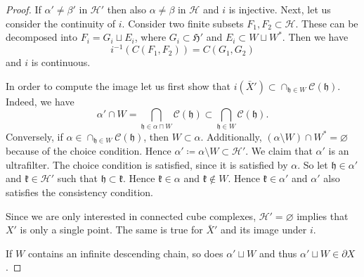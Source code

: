 \begin{proof}
  If \(\alpha' \neq \beta'\) in \(\mathcal{H}'\) then also \(\alpha \neq \beta\) in \(\mathcal{H}\) and \(i\) is injective. Next, let us consider the continuity of \(i\). Consider two finite subsets \(F_1, F_2 \subset \mathcal{H}\). These can be decomposed into \(F_i = G_i \sqcup E_i\), where \(G_i \subset \mathfrak{H}'\) and \(E_i \subset W \sqcup W^\ast\). Then we have
  \[
    i^{-1}(C(F_1, F_2)) = C(G_1, G_2)
  \]
  and \(i\) is continuous.

  In order to compute the image let us first show that \(i(\bar X') \subset \cap_{\mathfrak{h} \in W} \mathcal{C}(\mathfrak{h})\). Indeed, we have
  \[
    \alpha' \cap W = \bigcap_{\mathfrak{h} \in \alpha \sqcap W}\mathcal{C}(\mathfrak{h}) \subset \bigcap_{\mathfrak{h} \in W} \mathcal{C}(\mathfrak{h}).
  \]
  Conversely, if \(\alpha \in \cap_{\mathfrak{h} \in W}\mathcal{C}(\mathfrak{h})\), then \(W \subset \alpha\). Additionally, \((\alpha \setminus W) \cap W^\ast = \varnothing\) because of the choice condition. Hence \(\alpha' \coloneqq \alpha \setminus W \subset \mathcal{H}'\). We claim that \(\alpha'\) is an ultrafilter. The choice condition is satisfied, since it is satisfied by \(\alpha\). So let \(\mathfrak{h} \in \alpha'\) and \(\mathfrak{k} \in \mathcal{H}'\) such that \(\mathfrak{h} \subset \mathfrak{k}\). Hence \(\mathfrak{k} \in \alpha\) and \(\mathfrak{k} \notin W\). Hence \(\mathfrak{k} \in \alpha'\) and \(\alpha'\) also satisfies the consistency condition.

  Since we are only interested in connected cube complexes, \(\mathcal{H}' = \varnothing\) implies that \(X'\) is only a single point. The same is true for \(\bar X'\) and its image under \(i\).

  If \(W\) contains an infinite descending chain, so does \(\alpha' \sqcup W\) and thus \(\alpha' \sqcup W \in \partial X\).
\end{proof}

